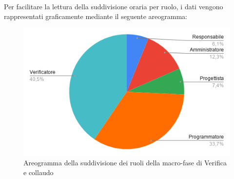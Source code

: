 \documentclass[../piano-di-progetto.tex]{subfiles}
\begin{document}
  Per facilitare la lettura della suddivisione oraria per ruolo, i dati vengono rappresentati graficamente mediante il seguente areogramma:
  \begin{figure}[H]
    \centering
    \includegraphics[width=12cm]{img/ruoli-verifica.png}
    \caption{Areogramma della suddivisione dei ruoli della macro-fase di Verifica e collaudo}
    \label{fig:ore-ruolo-verifica}
  \end{figure}
\end{document}
